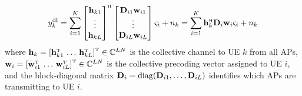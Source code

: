 \begin{align}
y_k^{\rm{dl}} =  \sum_{i=1}^{K} \begin{bmatrix} \vect{h}_{k1} \\ \vdots \\ \vect{h}_{kL} \end{bmatrix}^{\Htran} 
 \begin{bmatrix} \vect{D}_{i1}  \vect{w}_{i1} \\ \vdots \\ \vect{D}_{iL}  \vect{w}_{iL} \end{bmatrix}
 \varsigma_i + n_k =  \sum_{i=1}^{K} \vect{h}_k^{\Htran} \vect{D}_i \vect{w}_i \varsigma_i + n_k \label{eq:downlink-received-UEk-centralized}
\end{align}
where $\vect{h}_k=\left[\vect{h}_{k1}^{\Ttran} \, \ldots \, \vect{h}_{kL}^{\Ttran}\right]^{\Ttran} \in \mathbb{C}^{LN}$ is the collective channel to UE $k$ from all APs, $\vect{w}_i = \left[\vect{w}_{i1}^{\Ttran} \, \ldots \, \vect{w}_{iL}^{\Ttran}\right]^{\Ttran} \in \mathbb{C}^{LN}$ is the collective precoding vector assigned to UE $i$, and the block-diagonal matrix $\mathbf{D}_i = \mathrm{diag}(\mathbf{D}_{i1},\ldots,\mathbf{D}_{iL})$ identifies which APs are transmitting to UE $i$.
 
 
 


 
 
